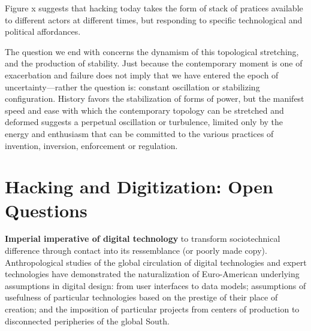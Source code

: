 \documentclass[10pt,letter,oneside]{scrartcl}
\begin{document}
Figure x suggests that hacking today takes the form of stack of pratices
available to different actors at different times, but responding to specific
technological and political affordances.


The question we end with concerns the dynamism of this topological stretching,
and the production of stability.  Just because the contemporary moment is one
of exacerbation and failure does not imply that we have entered the epoch of
uncertainty---rather the question is: constant oscillation or stabilizing
configuration.  History favors the stabilization of forms of power, but the
manifest speed and ease with which the contemporary topology can be stretched
and deformed suggests a perpetual oscillation or turbulence, limited only by
the energy and enthusiasm that can be committed to the various practices of
invention, inversion, enforcement or regulation.  


\section{Hacking and Digitization: Open Questions}

{\bf Imperial imperative of digital technology} to transform sociotechnical
difference through contact into its ressemblance (or poorly made copy).
Anthropological studies of the global circulation of digital technologies and
expert technologies have demonstrated the naturalization of Euro-American
underlying assumptions in digital design: from user interfaces to data models;
assumptions of usefulness of particular technologies based on the prestige of
their place of creation; and the imposition of particular projects from centers
of production to disconnected peripheries of the global South.

\end{document}
